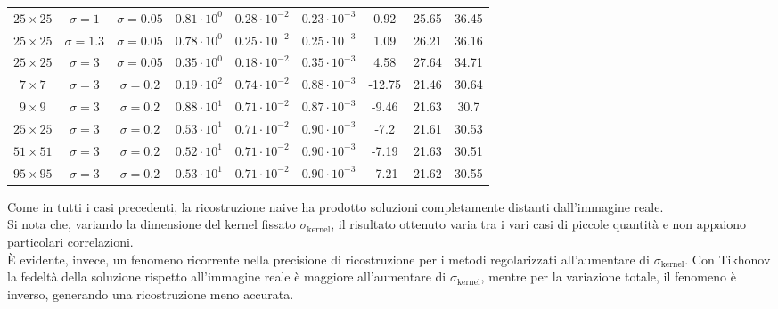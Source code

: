 \documentclass[11pt]{article}
\begin{document}
\begin{center}
\begin{tabular}{ |cc|c|c|c|c|c|c|c| }
    $25 \times 25$ & $\sigma=1$ & $\sigma=0.05$ & $0.81 \cdot 10^{0}$ & $0.28 \cdot 10^{-2}$ & $0.23 \cdot 10^{-3}$ & 0.92 & 25.65 & 36.45 \\
    $25 \times 25$ & $\sigma=1.3$ & $\sigma=0.05$ & $0.78 \cdot 10^{0}$ & $0.25 \cdot 10^{-2}$ & $0.25 \cdot 10^{-3}$ & 1.09 & 26.21 & 36.16 \\
    $25 \times 25$ & $\sigma=3$ & $\sigma=0.05$ & $0.35 \cdot 10^{0}$ & $0.18 \cdot 10^{-2}$ & $0.35 \cdot 10^{-3}$ & 4.58 & 27.64 & 34.71 \\
    \hline
	$7 \times 7$ & $\sigma=3$ & $\sigma=0.2$ & $0.19 \cdot 10^{2}$ & $0.74 \cdot 10^{-2}$ & $0.88 \cdot 10^{-3}$ & -12.75 & 21.46 & 30.64 \\
	$9 \times 9$ & $\sigma=3$ & $\sigma=0.2$ & $0.88 \cdot 10^{1}$ & $0.71 \cdot 10^{-2}$ & $0.87 \cdot 10^{-3}$ & -9.46 & 21.63 & 30.7 \\
	$25 \times 25$ & $\sigma=3$ & $\sigma=0.2$ & $0.53 \cdot 10^{1}$ & $0.71 \cdot 10^{-2}$ & $0.90 \cdot 10^{-3}$ & -7.2 & 21.61 & 30.53 \\
	$51 \times 51$ & $\sigma=3$ & $\sigma=0.2$ & $0.52 \cdot 10^{1}$ & $0.71 \cdot 10^{-2}$ & $0.90 \cdot 10^{-3}$ & -7.19 & 21.63 & 30.51 \\
	$95 \times 95$ & $\sigma=3$ & $\sigma=0.2$ & $0.53 \cdot 10^{1}$ & $0.71 \cdot 10^{-2}$ & $0.90 \cdot 10^{-3}$ & -7.21 & 21.62 & 30.55 \\
    \hline
    \end{tabular}
\end{center}
Come in tutti i casi precedenti, la ricostruzione naive ha prodotto soluzioni completamente distanti dall'immagine reale.\\
Si nota che, variando la dimensione del kernel fissato $\sigma_{\text{kernel}}$, il risultato ottenuto varia tra i vari casi di piccole quantità e non appaiono particolari correlazioni.\\
È evidente, invece, un fenomeno ricorrente nella precisione di ricostruzione per i metodi regolarizzati all'aumentare di $\sigma_{\text{kernel}}$. 
Con Tikhonov la fedeltà della soluzione rispetto all'immagine reale è maggiore all'aumentare di $\sigma_{\text{kernel}}$, mentre per la variazione totale, il fenomeno è inverso, generando una ricostruzione meno accurata.
\end{document}
